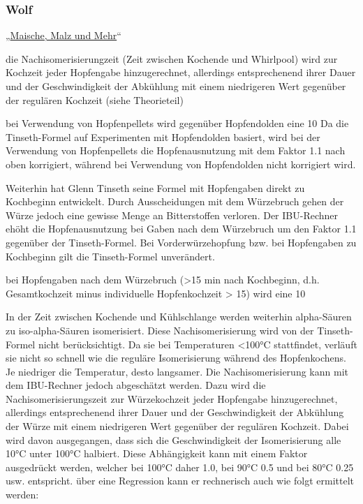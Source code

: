\documentclass[a4paper,parskip=half]{scrartcl}
\begin{document}
\subsubsection*{Wolf}

„\href{https://www.maischemalzundmehr.de/index.php?inhaltmitte=toolsiburechner}{Maische, Malz und Mehr}“

die Nachisomerisierungzeit (Zeit zwischen Kochende und Whirlpool) wird zur Kochzeit jeder Hopfengabe hinzugerechnet, allerdings entsprechenend ihrer Dauer und der Geschwindigkeit der Abkühlung mit einem niedrigeren Wert gegenüber der regulären Kochzeit (siehe Theorieteil) 

bei Verwendung von Hopfenpellets wird gegenüber Hopfendolden eine 10%
Da die Tinseth-Formel auf Experimenten mit Hopfendolden basiert, wird bei der Verwendung von Hopfenpellets die Hopfenausnutzung mit dem Faktor 1.1 nach oben korrigiert, während bei Verwendung von Hopfendolden nicht korrigiert wird. 

Weiterhin hat Glenn Tinseth seine Formel mit Hopfengaben direkt zu Kochbeginn entwickelt. Durch Ausscheidungen mit dem Würzebruch gehen der Würze jedoch eine gewisse Menge an Bitterstoffen verloren. Der IBU-Rechner ehöht die Hopfenausnutzung bei Gaben nach dem Würzebruch um den Faktor 1.1 gegenüber der Tinseth-Formel. Bei Vorderwürzehopfung bzw. bei Hopfengaben zu Kochbeginn gilt die Tinseth-Formel unverändert. 

bei Hopfengaben nach dem Würzebruch (>15 min nach Kochbeginn, d.h. Gesamtkochzeit minus individuelle Hopfenkochzeit > 15) wird eine 10%

In der Zeit zwischen Kochende und Kühlschlange werden weiterhin alpha-Säuren zu iso-alpha-Säuren isomerisiert. Diese Nachisomerisierung wird von der Tinseth-Formel nicht berücksichtigt. Da sie bei Temperaturen <100°C stattfindet, verläuft sie nicht so schnell wie die reguläre Isomerisierung während des Hopfenkochens. Je niedriger die Temperatur, desto langsamer. Die Nachisomerisierung kann mit dem IBU-Rechner jedoch abgeschätzt werden. Dazu wird die Nachisomerisierungszeit zur Würzekochzeit jeder Hopfengabe hinzugerechnet, allerdings entsprechenend ihrer Dauer und der Geschwindigkeit der Abkühlung der Würze mit einem niedrigeren Wert gegenüber der regulären Kochzeit. Dabei wird davon ausgegangen, dass sich die Geschwindigkeit der Isomerisierung alle 10°C unter 100°C halbiert. Diese Abhängigkeit kann mit einem Faktor ausgedrückt werden, welcher bei 100°C daher 1.0, bei 90°C 0.5 und bei 80°C 0.25 usw. entspricht. über eine Regression kann er rechnerisch auch wie folgt ermittelt werden: 
\end{document}
